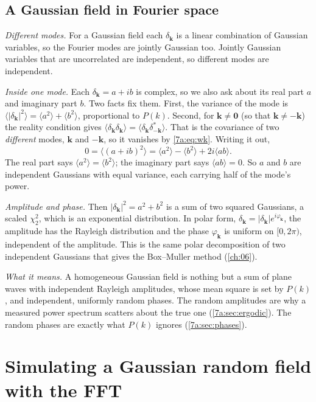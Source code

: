 \subsection{A Gaussian field in Fourier space}
\label{7a:sec:grf-fourier}

\emph{Different modes.} For a Gaussian field each $\delta_{\bm k}$ is a linear
combination of Gaussian variables, so the Fourier modes are jointly Gaussian too.
Jointly Gaussian variables that are uncorrelated are independent, so different
modes are independent.

\emph{Inside one mode.} Each $\delta_{\bm k}=a+ib$ is complex, so we also ask
about its real part $a$ and imaginary part $b$. Two facts fix them. First, the
variance of the mode is $\langle|\delta_{\bm k}|^2\rangle=\langle a^2\rangle+\langle b^2\rangle$,
proportional to $P(k)$. Second, for $\bm k\neq\bm 0$ (so that $\bm k\neq-\bm k$)
the reality condition gives
$\langle\delta_{\bm k}\delta_{\bm k}\rangle=\langle\delta_{\bm k}\delta_{-\bm k}^*\rangle$.
That is the covariance of two \emph{different} modes, $\bm k$ and $-\bm k$, so it
vanishes by \eqref{7a:eq:wk}. Writing it out,
\begin{equation*}
  0=\langle(a+ib)^2\rangle=\langle a^2\rangle-\langle b^2\rangle+2i\langle ab\rangle .
\end{equation*}
The real part says $\langle a^2\rangle=\langle b^2\rangle$; the imaginary part says
$\langle ab\rangle=0$. So $a$ and $b$ are independent Gaussians with equal
variance, each carrying half of the mode's power.

\emph{Amplitude and phase.} Then $|\delta_{\bm k}|^2=a^2+b^2$ is a sum of two
squared Gaussians, a scaled $\chi^2_2$, which is an exponential distribution. In
polar form, $\delta_{\bm k}=|\delta_{\bm k}|e^{i\varphi_{\bm k}}$, the amplitude
has the Rayleigh distribution and the phase $\varphi_{\bm k}$ is uniform on
$[0,2\pi)$, independent of the amplitude. This is the same polar decomposition of
two independent Gaussians that gives the Box--Muller method (\cref{ch:06}).

\emph{What it means.} A homogeneous Gaussian field is nothing but a sum of plane
waves with independent Rayleigh amplitudes, whose mean square is set by $P(k)$,
and independent, uniformly random phases. The random amplitudes are why a
measured power spectrum scatters about the true one (\cref{7a:sec:ergodic}). The
random phases are exactly what $P(k)$ ignores (\cref{7a:sec:phases}).
\section{Simulating a Gaussian random field with the FFT}
\label{7a:sec:simulate}

